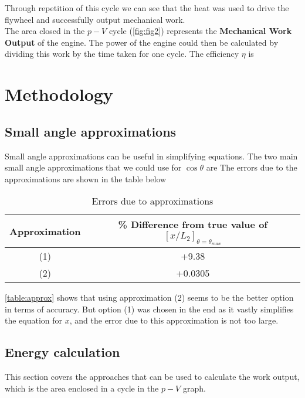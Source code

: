 \documentclass[10pt]{article}
\begin{document}
\noindent
Through repetition of this cycle we can see that the heat was used to drive the flywheel and successfully output mechanical work.\\[1em] 
The area closed in the $p-V$ cycle (\autoref{fig:fig2}) represents the \textbf{Mechanical Work Output} of the engine. The power of the engine could then be calculated by dividing this work by the time taken for one cycle. The efficiency $\eta$ is


\section{Methodology}
\subsection{Small angle approximations}
Small angle approximations can be useful in simplifying equations. The two main small angle approximations that we could use for $\cos\theta$ are
The errors due to the approximations are shown in the table below

\begin{table}[h]
\centering
\begin{tabular}{@{}cc@{}}
\toprule
Approximation & \% Difference from true value of $[x/L_2]_{\theta = \theta _{max}}$ \\ \midrule
(1)           & +9.38                                                               \\
(2)           & +0.0305                                                             \\ \bottomrule
\end{tabular}
\caption{Errors due to approximations}
\label{table:approx}
\end{table}
\FloatBarrier
\noindent
\autoref{table:approx} shows that using approximation (2) seems to be the better option in terms of accuracy. But option (1) was chosen in the end as it vastly simplifies the equation for $x$, and the error due to this approximation is not too large.
\subsection{Energy calculation}
This section covers the approaches that can be used to calculate the work output, which is the area enclosed in a cycle in the $p-V$ graph.
\end{document}

